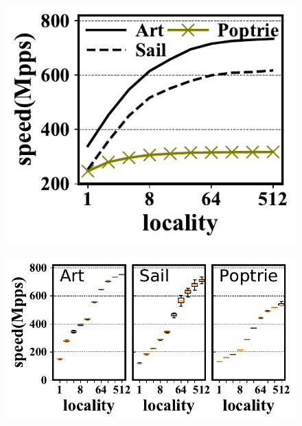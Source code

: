 \documentclass[a4paper]{article}
\begin{document}
    \begin{figure}[htbp]
        \includegraphics{../result/example.pdf}
    \end{figure}

    \begin{figure}[htbp]
        \includegraphics{../result/example2.pdf}
    \end{figure}
\end{document}
